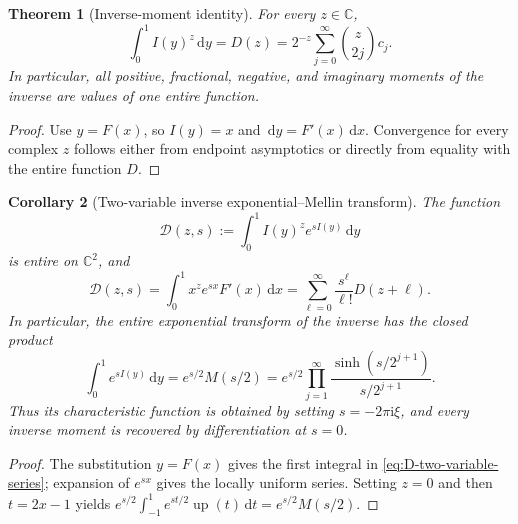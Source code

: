 \documentclass[11pt]{article}
\newtheorem{theorem}{Theorem}[section]
\newtheorem{corollary}[theorem]{Corollary}
\theoremstyle{definition}
\theoremstyle{remark}
\DeclareMathOperator{\upf}{up}
\newcommand{\C}{\mathbb C}
\newcommand{\dd}{\,\mathrm d}
\newcommand{\ii}{\mathrm i}
\begin{document}
\begin{theorem}[Inverse-moment identity]
\label{thm:inverse-mellin}
For every \(z\in\C\),
\begin{equation}
 \boxed{
 \int_0^1I(y)^z\dd y=D(z)
 =2^{-z}\sum_{j=0}^{\infty}\binom z{2j}c_j.
 }                                                        \label{eq:inverse-mellin}
\end{equation}
In particular, all positive, fractional, negative, and imaginary moments of the inverse
are values of one entire function.
\end{theorem}

\begin{proof}
Use \(y=F(x)\), so \(I(y)=x\) and \(\dd y=F'(x)\dd x\).  Convergence for every
complex \(z\) follows either from endpoint asymptotics or directly from equality with the
entire function \(D\).
\end{proof}

\begin{corollary}[Two-variable inverse exponential--Mellin transform]
\label{cor:inverse-two-variable-transform}
The function
\begin{equation}
 \mathcal D(z,s):=\int_0^1 I(y)^z e^{sI(y)}\dd y             \label{eq:D-two-variable-def}
\end{equation}
is entire on \(\C^2\), and
\begin{equation}
 \boxed{
 \mathcal D(z,s)=\int_0^1x^ze^{sx}F'(x)\dd x
 =\sum_{\ell=0}^{\infty}\frac{s^\ell}{\ell!}D(z+\ell).
 }                                                          \label{eq:D-two-variable-series}
\end{equation}
In particular, the entire exponential transform of the inverse has the closed product
\begin{equation}
 \boxed{
 \int_0^1e^{sI(y)}\dd y=e^{s/2}M(s/2)
 =e^{s/2}\prod_{j=1}^{\infty}
   \frac{\sinh(s/2^{j+1})}{s/2^{j+1}}.
 }                                                          \label{eq:inverse-exponential-transform}
\end{equation}
Thus its characteristic function is obtained by setting \(s=-2\pi\ii\xi\), and every
inverse moment is recovered by differentiation at \(s=0\).
\end{corollary}

\begin{proof}
The substitution \(y=F(x)\) gives the first integral in
\eqref{eq:D-two-variable-series}; expansion of \(e^{sx}\) gives the locally uniform
series.  Setting \(z=0\) and then \(t=2x-1\) yields
\(
 e^{s/2}\int_{-1}^1e^{st/2}\upf(t)\dd t=e^{s/2}M(s/2)
\).
\end{proof}
\end{document}

